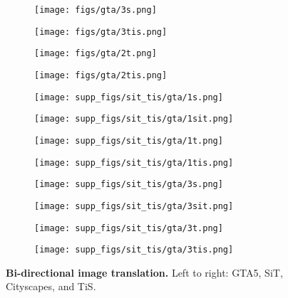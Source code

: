 \documentclass[letterpaper]{article} \usepackage[]{aaai23}  \usepackage{times}  \usepackage{helvet}  \usepackage{courier}  \usepackage[hyphens]{url}  \usepackage{graphicx} \urlstyle{rm} \def\UrlFont{\rm}  \usepackage{natbib}  \usepackage{caption} \frenchspacing  \setlength{\pdfpagewidth}{8.5in} \setlength{\pdfpageheight}{11in} \usepackage{algorithm}
\begin{document}
\begin{figure*}
    \begin{subfigure}{0.24\linewidth}
        \centering
        \texttt{[image: figs/gta/3s.png]}
    \end{subfigure}
    \begin{subfigure}{0.24\linewidth}
        \centering
        \texttt{[image: figs/gta/3tis.png]}
    \end{subfigure}
    \begin{subfigure}{0.24\linewidth}
        \centering
        \texttt{[image: figs/gta/2t.png]}
    \end{subfigure}
    \begin{subfigure}{0.24\linewidth}
        \centering
        \texttt{[image: figs/gta/2tis.png]}
    \end{subfigure}
    
    \begin{subfigure}{0.24\linewidth}
        \centering
        \texttt{[image: supp\_figs/sit\_tis/gta/1s.png]}
    \end{subfigure}
    \begin{subfigure}{0.24\linewidth}
        \centering
        \texttt{[image: supp\_figs/sit\_tis/gta/1sit.png]}
    \end{subfigure}
    \begin{subfigure}{0.24\linewidth}
        \centering
        \texttt{[image: supp\_figs/sit\_tis/gta/1t.png]}
    \end{subfigure}
    \begin{subfigure}{0.24\linewidth}
        \centering
        \texttt{[image: supp\_figs/sit\_tis/gta/1tis.png]}
    \end{subfigure}
    


    \begin{subfigure}{0.24\linewidth}
        \centering
        \texttt{[image: supp\_figs/sit\_tis/gta/3s.png]}
    \end{subfigure}
    \begin{subfigure}{0.24\linewidth}
        \centering
        \texttt{[image: supp\_figs/sit\_tis/gta/3sit.png]}
    \end{subfigure}
    \begin{subfigure}{0.24\linewidth}
        \centering
        \texttt{[image: supp\_figs/sit\_tis/gta/3t.png]}
    \end{subfigure}
    \begin{subfigure}{0.24\linewidth}
        \centering
        \texttt{[image: supp\_figs/sit\_tis/gta/3tis.png]}
    \end{subfigure}
    \caption{\textbf{Bi-directional  image translation.} Left to right: GTA5, SiT, Cityscapes, and TiS.}
    \label{fig:sit_tis_gta_translations}
\end{figure*}
\end{document}
